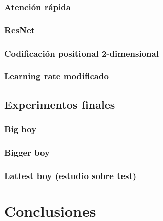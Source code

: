\documentclass[a4paper, 20pt, dvipsnames]{article}
\begin{document}
\subsubsection{Atención rápida}
\label{exp:3a}

\subsubsection{ResNet}
\label{exp:3b}

\subsubsection{Codificación positional 2-dimensional}
\label{exp:3c}

\subsubsection{Learning rate modificado}

\subsection{Experimentos finales}

\subsubsection{Big boy}

\subsubsection{Bigger boy}

\subsubsection{Lattest boy (estudio sobre test)}

\section{Conclusiones}








\printbibliography
\end{document}
